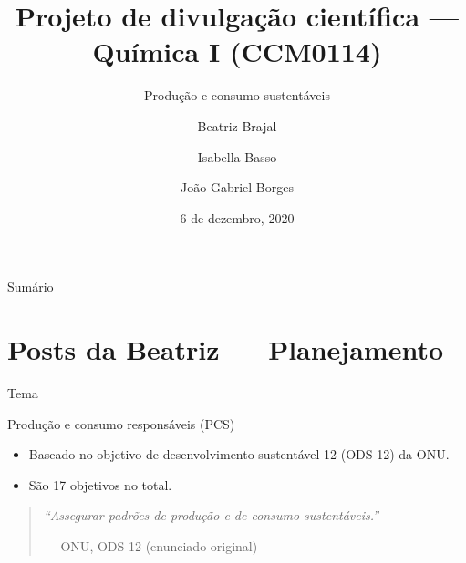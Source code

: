 \documentclass{beamer}
\title{Projeto de divulgação científica --- Química I (CCM0114)}
\subtitle{Produção e consumo sustentáveis}
\date{6 de dezembro, 2020}
\author{Beatriz Brajal \and Isabella Basso \and João Gabriel Borges}
\institute{Universidade de São Paulo --- Ciências Moleculares}
\begin{document}
  \begin{frame}
  	\titlepage %
  \end{frame}
  
  \begin{frame}{Sumário}
  	\tableofcontents
  \end{frame}
  
  \section{Posts da Beatriz --- Planejamento}
  
  \begin{frame}{Tema}
  	\begin{block}{Produção e consumo responsáveis (PCS)}
  		\begin{itemize}
  			\item Baseado no objetivo de desenvolvimento sustentável 12 (ODS 12) da ONU.
  			\item São 17 objetivos no total.
  		\end{itemize}
  	
  		\bigskip
  	
	  	\begin{quotation}
	  		\itshape ``Assegurar padrões de produção e de consumo sustentáveis.''
	  		\par\raggedleft--- \textup{ONU}, ODS 12 \textup{(enunciado original)}
	  		
	  	\end{quotation}
  	\end{block}
  	
  \end{frame}
\end{document}
